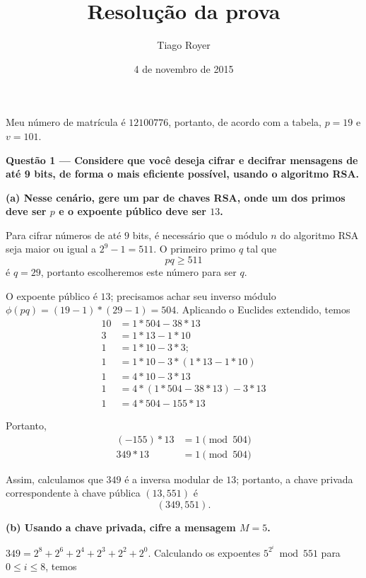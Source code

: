 \documentclass{article}
\begin{document}
\title{Resolução da prova}
\author{Tiago Royer}
\date{4 de novembro de 2015}
\maketitle

Meu número de matrícula é $12100776$,
portanto, de acordo com a tabela,
$p = 19$ e $v = 101$.

\textbf{
    Questão 1 ---
    Considere que você deseja cifrar e decifrar mensagens de até 9 bits,
    de forma o mais eficiente possível,
    usando o algoritmo RSA.
}

\textbf{
    (a) Nesse cenário, gere um par de chaves RSA,
    onde um dos primos deve ser $p$
    e o expoente público deve ser $13$.
}

Para cifrar números de até $9$ bits,
é necessário que o módulo $n$ do algoritmo RSA
seja maior ou igual a $2^9-1 = 511$.
O primeiro primo $q$ tal que
\begin{equation*}
    pq \geq 511
\end{equation*}
é $q = 29$,
portanto escolheremos este número para ser $q$.

O expoente público é $13$;
precisamos achar seu inverso módulo $\phi(pq) = (19-1)*(29-1) = 504$.
Aplicando o Euclides extendido, temos
\begin{align*}
    10 &= 1*504 - 38*13 \\
    3 &= 1*13 - 1*10 \\
    1 &= 1*10 - 3*3; \\
    1 &= 1*10 - 3*(1*13 - 1*10) \\
    1 &= 4*10 - 3*13 \\
    1 &= 4*(1*504 - 38*13) - 3*13 \\
    1 &= 4*504 - 155*13
\end{align*}

Portanto,
\begin{align*}
    (-155) * 13 &= 1 \pmod {504} \\
    349 * 13 &= 1 \pmod {504}
\end{align*}

Assim,
calculamos que $349$ é a inversa modular de $13$;
portanto, a chave privada correspondente à chave pública $(13, 551)$ é
\begin{equation*}
    (349, 551).
\end{equation*}

\textbf{
    (b) Usando a chave privada, cifre a mensagem $M = 5$.
}

$349 = 2^8 + 2^6 + 2^4 + 2^3 + 2^2 + 2^0$.
Calculando os expoentes $5^{2^i} \bmod 551$ para $0 \leq i \leq 8$,
temos
\end{document}
